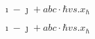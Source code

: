 \documentclass[
cdfont=heavy,
]{tudscrreprt}
\begin{document}
$\imath - \jmath + abc \cdot \hbar vs. x_{\hbar}$

\boldmath
$\imath - \jmath + abc \cdot \hbar vs. x_{\hbar}$
\end{document}
